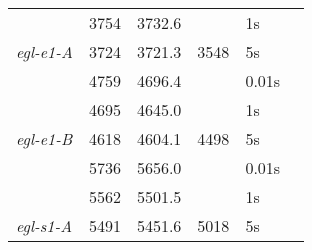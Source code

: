 \documentclass[conference,compsoc]{IEEEtran}
\begin{document}
\begin{minipage}{\linewidth}
\begin{tabular}{ C{0.6in} C{0.4in} *4{C{0.4in}}}
						  & 3754              & 3732.6           &         & 1s       \\
		\textit{egl-e1-A} & 3724              & 3721.3           & 3548    & 5s       \\
		\bottomrule[0.25pt]
						  & 4759              & 4696.4           &         & 0.01s    \\
						  & 4695              & 4645.0           &         & 1s       \\
		\textit{egl-e1-B} & 4618              & 4604.1           & 4498    & 5s       \\
		\bottomrule[0.25pt]					
					      & 5736            & 5656.0           &         & 0.01s    \\
		& 5562            & 5501.5           &	     & 1s       \\
		\textit{egl-s1-A} & 5491            & 5451.6           & 5018    & 5s       \\ 
		\bottomrule[0.25pt]
		\end {tabular}\par
		\bigskip
		\centering{}
		
\end{minipage}
\end{document}
